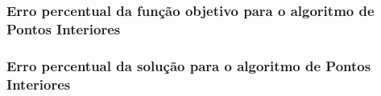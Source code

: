 \subsubsection{Erro percentual da função objetivo para o algoritmo de Pontos Interiores}
    
\subsubsection{Erro percentual da solução para o algoritmo de Pontos Interiores}
